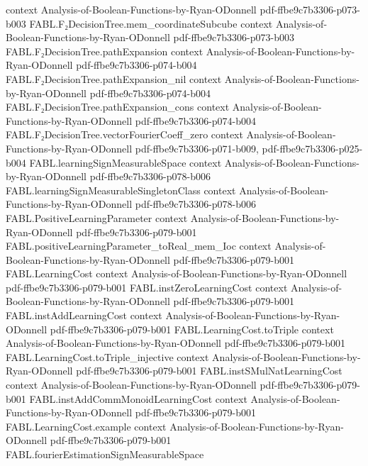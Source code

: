\begin{theorem}
  {context}
  {Analysis-of-Boolean-Functions-by-Ryan-ODonnell}
  {pdf-ffbe9c7b3306-p073-b003}
\proofstep
  {FABL.F₂DecisionTree.mem_coordinateSubcube}
  {context}
  {Analysis-of-Boolean-Functions-by-Ryan-ODonnell}
  {pdf-ffbe9c7b3306-p073-b003}
\proofstep
  {FABL.F₂DecisionTree.pathExpansion}
  {context}
  {Analysis-of-Boolean-Functions-by-Ryan-ODonnell}
  {pdf-ffbe9c7b3306-p074-b004}
\proofstep
  {FABL.F₂DecisionTree.pathExpansion_nil}
  {context}
  {Analysis-of-Boolean-Functions-by-Ryan-ODonnell}
  {pdf-ffbe9c7b3306-p074-b004}
\proofstep
  {FABL.F₂DecisionTree.pathExpansion_cons}
  {context}
  {Analysis-of-Boolean-Functions-by-Ryan-ODonnell}
  {pdf-ffbe9c7b3306-p074-b004}
\proofstep
  {FABL.F₂DecisionTree.vectorFourierCoeff_zero}
  {context}
  {Analysis-of-Boolean-Functions-by-Ryan-ODonnell}
  {pdf-ffbe9c7b3306-p071-b009,
    pdf-ffbe9c7b3306-p025-b004}
\proofstep
  {FABL.learningSignMeasurableSpace}
  {context}
  {Analysis-of-Boolean-Functions-by-Ryan-ODonnell}
  {pdf-ffbe9c7b3306-p078-b006}
\proofstep
  {FABL.learningSignMeasurableSingletonClass}
  {context}
  {Analysis-of-Boolean-Functions-by-Ryan-ODonnell}
  {pdf-ffbe9c7b3306-p078-b006}
\proofstep
  {FABL.PositiveLearningParameter}
  {context}
  {Analysis-of-Boolean-Functions-by-Ryan-ODonnell}
  {pdf-ffbe9c7b3306-p079-b001}
\proofstep
  {FABL.positiveLearningParameter_toReal_mem_Ioc}
  {context}
  {Analysis-of-Boolean-Functions-by-Ryan-ODonnell}
  {pdf-ffbe9c7b3306-p079-b001}
\proofstep
  {FABL.LearningCost}
  {context}
  {Analysis-of-Boolean-Functions-by-Ryan-ODonnell}
  {pdf-ffbe9c7b3306-p079-b001}
\proofstep
  {FABL.instZeroLearningCost}
  {context}
  {Analysis-of-Boolean-Functions-by-Ryan-ODonnell}
  {pdf-ffbe9c7b3306-p079-b001}
\proofstep
  {FABL.instAddLearningCost}
  {context}
  {Analysis-of-Boolean-Functions-by-Ryan-ODonnell}
  {pdf-ffbe9c7b3306-p079-b001}
\proofstep
  {FABL.LearningCost.toTriple}
  {context}
  {Analysis-of-Boolean-Functions-by-Ryan-ODonnell}
  {pdf-ffbe9c7b3306-p079-b001}
\proofstep
  {FABL.LearningCost.toTriple_injective}
  {context}
  {Analysis-of-Boolean-Functions-by-Ryan-ODonnell}
  {pdf-ffbe9c7b3306-p079-b001}
\proofstep
  {FABL.instSMulNatLearningCost}
  {context}
  {Analysis-of-Boolean-Functions-by-Ryan-ODonnell}
  {pdf-ffbe9c7b3306-p079-b001}
\proofstep
  {FABL.instAddCommMonoidLearningCost}
  {context}
  {Analysis-of-Boolean-Functions-by-Ryan-ODonnell}
  {pdf-ffbe9c7b3306-p079-b001}
\proofstep
  {FABL.LearningCost.example}
  {context}
  {Analysis-of-Boolean-Functions-by-Ryan-ODonnell}
  {pdf-ffbe9c7b3306-p079-b001}
\proofstep
  {FABL.fourierEstimationSignMeasurableSpace}

\end{theorem}
